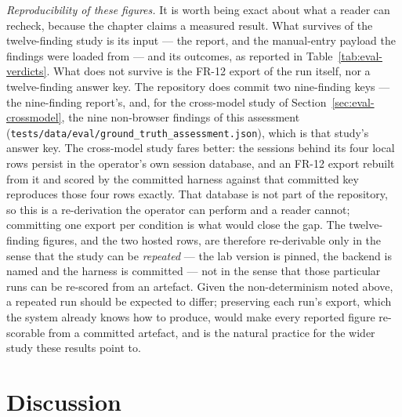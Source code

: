 \emph{Reproducibility of these figures.} It is worth being exact about what a reader
can recheck, because the chapter claims a measured result. What survives of the
twelve-finding study is its input --- the report, and the manual-entry payload the
findings were loaded from --- and its outcomes, as reported in
Table~\ref{tab:eval-verdicts}. What does not survive is the FR-12 export of the run
itself, nor a twelve-finding answer key. The repository does commit two nine-finding
keys --- the nine-finding report's, and, for the cross-model study of
Section~\ref{sec:eval-crossmodel}, the nine non-browser findings of this assessment
(\texttt{tests/data/eval/ground\_truth\_assessment.json}), which is that study's answer
key. The cross-model study fares better: the sessions behind its four local rows persist
in the operator's own session database, and an FR-12 export rebuilt from it and scored by
the committed harness against that committed key reproduces those four rows exactly. That
database is not part of the repository, so this is a re-derivation the operator can
perform and a reader cannot; committing one export per condition is what would close the
gap. The twelve-finding figures, and the two hosted rows, are therefore
re-derivable only in the sense that the study can be \emph{repeated} --- the lab version is
pinned, the backend is named and the harness is committed --- not in the sense that
those particular runs can be re-scored from an artefact. Given the non-determinism noted
above, a repeated run should be expected to differ; preserving each run's export, which
the system already knows how to produce, would make every reported figure re-scorable
from a committed artefact, and is the natural practice for the wider study these results
point to.

\section{Discussion}
\label{sec:eval-discussion}

